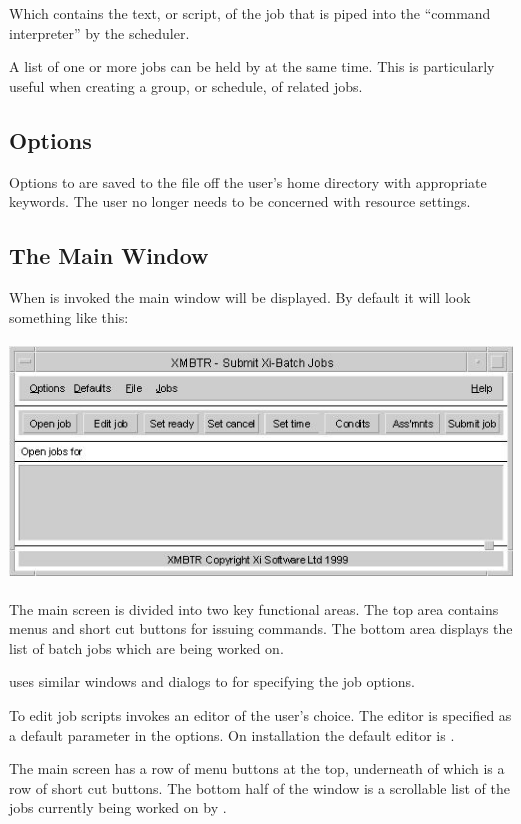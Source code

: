 Which contains the text, or script, of the job that is piped into the ``command interpreter'' by the scheduler.

A list of one or more jobs can be held by \PrXmbtr{} at the same time. This is particularly useful when creating a group, or
schedule, of related jobs.

\subsection{Options}
Options to \PrXmbtr{} are saved to the file \homeconfigpath{} off the user's home directory with appropriate keywords.
The user no longer needs to be concerned with resource settings.

\subsection{The Main Window}
When \PrXmbtr{} is invoked the main window will be displayed. By default it will look something like this:

 \includegraphics[width=13.72cm,height=6.346cm]{img/ref38.jpg}

The main screen is divided into two key functional areas. The top area contains menus and short cut buttons for issuing commands. The bottom
area displays the list of batch jobs which are being worked on.

\PrXmbtr{} uses similar windows and dialogs to \PrXmbtq{} for specifying the job options.

To edit job scripts \PrXmbtr{} invokes an editor of the user's choice. The editor is specified as a default parameter in the \PrXmbtr{} options. On
installation the default editor is .

The main screen has a row of menu buttons at the top, underneath of which is a row of short cut buttons. The bottom half of the window is a
scrollable list of the jobs currently being worked on by \PrXmbtr{}.


